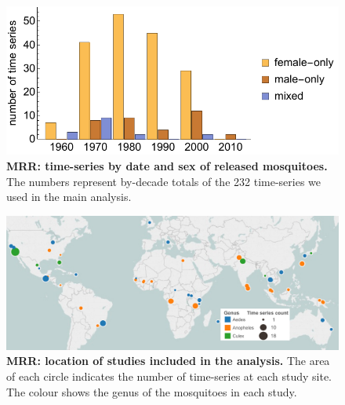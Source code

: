 \documentclass[12pt]{article}
\begin{document}
\begin{figure}[h]
	\centerline{\includegraphics[width=1\textwidth]{./Figure_files/mrr_sexReleasesOverTime.pdf}}
	\caption{\textbf{MRR: time-series by date and sex of released mosquitoes.} The numbers represent by-decade totals of the 232 time-series we used in the main analysis.}
	\label{fig:mrr_sexReleasesOverTime}
\end{figure}

\begin{figure}[h]
	\centerline{\includegraphics[width=1.25\textwidth]{./Figure_files/mrr_mapGenusCropped.pdf}}
	\caption{\textbf{MRR: location of studies included in the analysis.} The area of each circle indicates the number of time-series at each study site. The colour shows the genus of the mosquitoes in each study.}
	\label{fig:mrr_lifetimes_map}
\end{figure}
\end{document}
